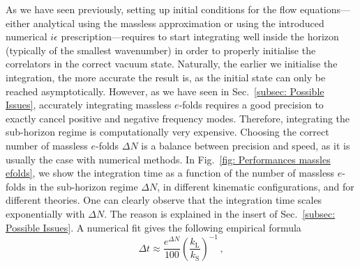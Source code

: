 \documentclass[11pt]{article}
\numberwithin{equation}{section} %
\begin{document}
\vskip 4pt
As we have seen previously, setting up initial conditions for the flow equations---either analytical using the massless approximation or using the introduced numerical $i\epsilon$ prescription---requires to start integrating well inside the horizon (typically of the smallest wavenumber) in order to properly initialise the correlators in the correct vacuum state. Naturally, the earlier we initialise the integration, the more accurate the result is, as the initial state can only be reached asymptotically. However, as we have seen in Sec.~\ref{subsec: Possible Issues}, accurately integrating massless $e$-folds requires a good precision to exactly cancel positive and negative frequency modes. Therefore, integrating the sub-horizon regime is computationally very expensive. Choosing the correct number of massless $e$-folds $\Delta N$ is a balance between precision and speed, as it is usually the case with numerical methods. In Fig.~\ref{fig: Performances massles efolds}, we show the integration time as a function of the number of massless $e$-folds in the sub-horizon regime $\Delta N$, in different kinematic configurations, and for different theories. One can clearly observe that the integration time scales exponentially with $\Delta N$. The reason is explained in the insert of Sec.~\ref{subsec: Possible Issues}. A numerical fit gives the following empirical formula
\begin{equation}
    \Delta t \approx \frac{e^{\Delta N}}{100} \left(\frac{k_{\text{L}}}{k_{\text{S}}}\right)^{-1}\,,
\end{equation}
\end{document}
